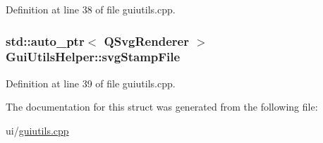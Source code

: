 Definition at line 38 of file guiutils.\+cpp.

\hypertarget{structGuiUtilsHelper_ab813ae9d515c979bdc124edb8e204aa0}{
\subsubsection[{svg\+Stamp\+File}]{\setlength{\rightskip}{0pt plus 5cm}std\+::auto\+\_\+ptr$<$ Q\+Svg\+Renderer $>$ Gui\+Utils\+Helper\+::svg\+Stamp\+File}}\label{structGuiUtilsHelper_ab813ae9d515c979bdc124edb8e204aa0}


Definition at line 39 of file guiutils.\+cpp.



The documentation for this struct was generated from the following file\+:\begin{DoxyCompactItemize}
\item 
ui/\hyperlink{guiutils_8cpp}{guiutils.\+cpp}\end{DoxyCompactItemize}
